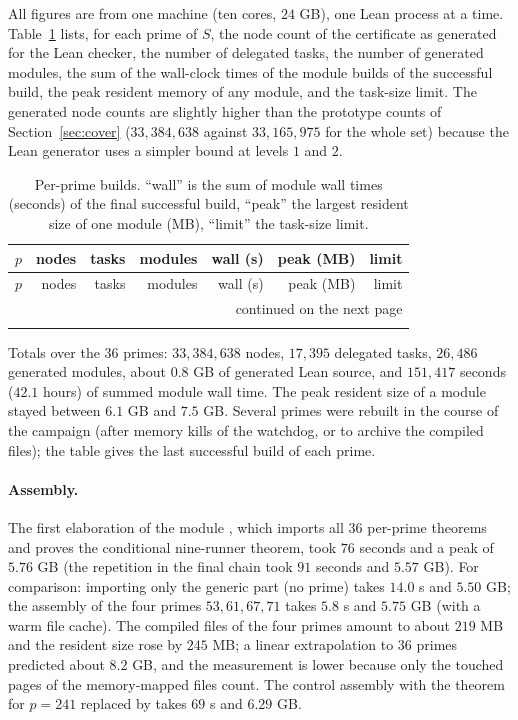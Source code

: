 \documentclass[11pt]{article}
\theoremstyle{remark}
\begin{document}
All figures are from one machine (ten cores, $24$ GB), one Lean process at a time. Table~\ref{tab:primes} lists, for each prime of $S$, the node count of the certificate as generated for the Lean checker, the number of delegated tasks, the number of generated modules, the sum of the wall-clock times of the module builds of the successful build, the peak resident memory of any module, and the task-size limit. The generated node counts are slightly higher than the prototype counts of Section~\ref{sec:cover} ($33{,}384{,}638$ against $33{,}165{,}975$ for the whole set) because the Lean generator uses a simpler bound at levels $1$ and $2$.

{\small
\begin{longtable}{rrrrrrr}
\caption{Per-prime builds. ``wall'' is the sum of module wall times (seconds) of the final successful build, ``peak'' the largest resident size of one module (MB), ``limit'' the task-size limit.}\label{tab:primes}\\
\toprule
$p$ & nodes & tasks & modules & wall (s) & peak (MB) & limit\\
\midrule
\endfirsthead
\toprule
$p$ & nodes & tasks & modules & wall (s) & peak (MB) & limit\\
\midrule
\endhead
\midrule
\multicolumn{7}{r}{continued on the next page}\\
\endfoot
\bottomrule
\endlastfoot

\end{longtable}
}

Totals over the $36$ primes: $33{,}384{,}638$ nodes, $17{,}395$ delegated tasks, $26{,}486$ generated modules, about $0.8$ GB of generated Lean source, and $151{,}417$ seconds ($42.1$ hours) of summed module wall time. The peak resident size of a module stayed between $6.1$ GB and $7.5$ GB. Several primes were rebuilt in the course of the campaign (after memory kills of the watchdog, or to archive the compiled files); the table gives the last successful build of each prime.

\paragraph{Assembly.} The first elaboration of the module , which imports all $36$ per-prime theorems and proves the conditional nine-runner theorem, took $76$ seconds and a peak of $5.76$ GB (the repetition in the final chain took $91$ seconds and $5.57$ GB). For comparison: importing only the generic part (no prime) takes $14.0$ s and $5.50$ GB; the assembly of the four primes $53,61,67,71$ takes $5.8$ s and $5.75$ GB (with a warm file cache). The compiled files of the four primes amount to about $219$ MB and the resident size rose by $245$ MB; a linear extrapolation to $36$ primes predicted about $8.2$ GB, and the measurement is lower because only the touched pages of the memory-mapped files count. The control assembly with the theorem for $p=241$ replaced by  takes $69$ s and $6.29$ GB.
\end{document}
